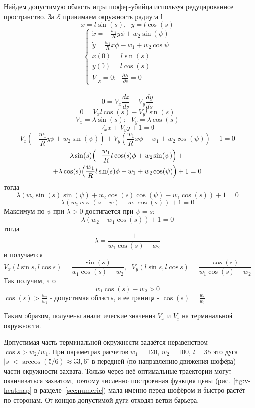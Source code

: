 \documentclass[14pt,a4paper]{extarticle}
\begin{document}
	Найдем допустимую область игры шофер-убийца используя редуцированное пространство. За $ \mathcal{E}$ принимаем окружность радиуса l 
	\[x = l\sin(s), \ \ \ y = l\cos(s)\]
	\begin{equation*}
		\begin{cases}
			\dot{x} = - \frac{w_1}{R}y\phi + w_2\sin(\psi) \\
			\dot{y} = \frac{w_1}{R}x\phi - w_1 + w_2\cos{\psi} \\
			x(0) = l\sin(s) \\
			y(0) = l\cos(s) \\
			V|_\mathcal{E} = 0; \ \ \ \frac{\partial H}{\partial s} = 0
		\end{cases}
	\end{equation*}
	\\
	\[0 = V_x \frac{dx}{ds} + V_y \frac{dy}{ds}\]
	\[0 = V_x l \cos(s) - V_y l \sin(s)\]
	\[V_x = \lambda \sin(s); \ \ \ V_y = \lambda \cos(s)\] 
	\[V_x \dot{x} + V_y \dot{y} + 1 = 0\]
	\[V_x(-\frac{w_1}{R}y\phi + w_2\sin(\psi)) + V_y(\frac{w_1}{R}x\phi - w_1 + w_2\cos(\psi)) + 1 = 0\]
	\begin{multline*}
	\lambda\sin(s)\Bigl(-\frac{w_1}{R}l\cos(s)\phi + w_2\sin(\psi)\Bigr) +{}\\
	+ \lambda\cos(s)\Bigl(\frac{w_1}{R}l\sin(s)\phi - w_1 + w_2\cos(\psi)\Bigr) + 1 = 0
	\end{multline*}
	тогда
	\[\lambda(w_2\sin(s)\sin(\psi) + w_2\cos(s)\cos(\psi) - w_1\cos(s)) + 1 = 0\]
	\[\lambda(w_2\cos(s-\psi) - w_1\cos(s)) + 1 = 0\]
	Максимум по $\psi$ при $\lambda > 0$ достигается при $\overline{\psi} = s$:
\[\lambda(w_2 - w_1\cos(s)) + 1 = 0\]
	тогда 
	\[\lambda = \frac{1}{w_1\cos(s) - w_2}\]
	и получается
	\[V_x(l\sin{s}, l\cos{s}) = \frac{\sin(s)}{w_1\cos(s) - w_2}, \ \ \ V_y(l\sin{s}, l\cos{s}) = \frac{\cos(s)}{w_1\cos(s) - w_2}\]
	Так получим, что
	\[w_1\cos(s) - w_2 > 0\]
	$\cos(s) > \frac{w_2}{w_1}$ - допустимая область, а ее граница - $\cos(s) = \frac{w_2}{w_1}$
	
	Таким образом, получены аналитические значения $V_x$ и $V_y$ на терминальной окружности.

	Допустимая часть терминальной окружности задаётся неравенством $\cos s > w_2/w_1$. При параметрах расчётов $w_1 = 120$, $w_2 = 100$, $l = 35$ это дуга $|s| < \arccos(5/6) \approx 33{,}6^\circ$ в передней (по направлению движения шофёра) части окружности захвата. Только через неё оптимальные траектории могут оканчиваться захватом, поэтому численно построенная функция цены (рис.~\ref{fig:v-heatmap} в разделе~\ref{sec:numeric}) мала именно перед шофёром и быстро растёт по сторонам. От концов допустимой дуги отходят ветви барьера.
\end{document}

